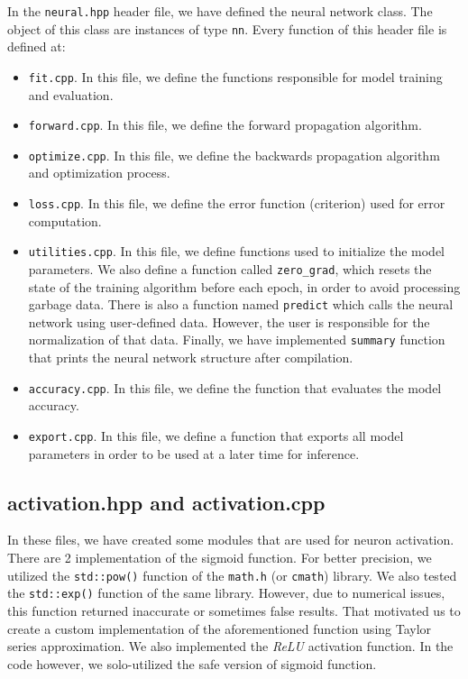 In the \verb|neural.hpp| header file, we have defined the neural network class. The object of this class are instances of type \verb|nn|. Every function of this header file is defined at:
\begin{itemize}
\item \verb|fit.cpp|. In this file, we define the functions responsible for model training and evaluation.
\item \verb|forward.cpp|. In this file, we define the forward propagation algorithm.
\item \verb|optimize.cpp|. In this file, we define the backwards propagation algorithm and optimization process.
\item \verb|loss.cpp|. In this file, we define the error function (criterion) used for error computation.
\item \verb|utilities.cpp|. In this file, we define functions used to initialize the model parameters. We also define a function called \verb|zero_grad|, which resets the state of the training algorithm before each epoch, in order to avoid processing garbage data. There is also a function named \verb|predict| which calls the neural network using user-defined data. However, the user is responsible for the normalization of that data. Finally, we have implemented \verb|summary| function that prints the neural network structure after compilation.
\item \verb|accuracy.cpp|. In this file, we define the function that evaluates the model accuracy.
\item \verb|export.cpp|. In this file, we define a function that exports all model parameters in order to be used at a later time for inference.
\end{itemize}

\subsection{activation.hpp and activation.cpp}

In these files, we have created some modules that are used for neuron activation. There are 2 implementation of the sigmoid function. For better precision, we utilized the \verb|std::pow()| function of the \verb|math.h| (or \verb|cmath|) library. We also tested the \verb|std::exp()| function of the same library. However, due to numerical issues, this function returned inaccurate or sometimes false results. That motivated us to create a custom implementation of the aforementioned function using Taylor series approximation. We also implemented the \textit{ReLU} activation function. In the code however, we solo-utilized the safe version of sigmoid function.

